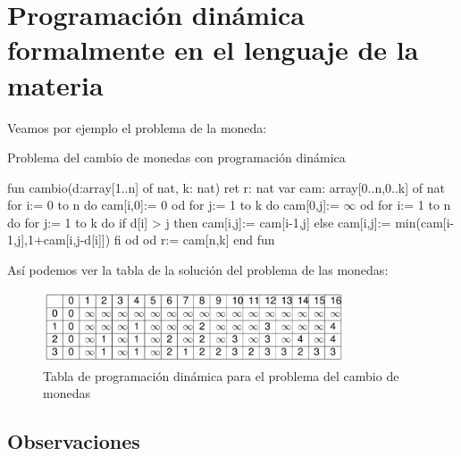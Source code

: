 \newpage
\section{Programación dinámica formalmente en el lenguaje de la materia}
Veamos por ejemplo el problema de la moneda:

\begin{codebox}{Problema del cambio de monedas con programación dinámica}
\begin{pascallike}
fun cambio(d:array[1..n] of nat, k: nat) ret r: nat
    var cam: array[0..n,0..k] of nat
    for i:= 0 to n do cam[i,0]:= 0 od
    for j:= 1 to k do cam[0,j]:= $\infty$ od
    for i:= 1 to n do
        for j:= 1 to k do
            if d[i] > j then cam[i,j]:= cam[i-1,j]
            else cam[i,j]:= min(cam[i-1,j],1+cam[i,j-d[i]])
            fi
        od
    od
    r:= cam[n,k]
end fun
\end{pascallike}
\end{codebox}

Así podemos ver la tabla de la solución del problema de las monedas:

\begin{figure}[h]
    \centering
    \includegraphics[width=0.8\textwidth]{estáticos/figura10.png}
    \caption{Tabla de programación dinámica para el problema del cambio de monedas}
\end{figure}

\subsection{Observaciones}

